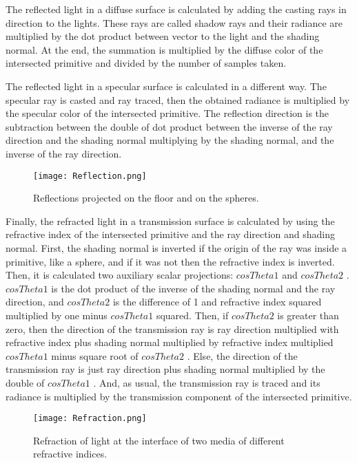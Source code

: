 \par
The reflected light in a diffuse surface is calculated by adding the casting rays in direction to the lights.
These rays are called shadow rays and their radiance are multiplied by the dot product between vector to the light and the shading normal.
At the end, the summation is multiplied by the diffuse color of the intersected primitive and divided by the number of samples taken.

\par
The reflected light in a specular surface is calculated in a different way.
The specular ray is casted and ray traced, then the obtained radiance is multiplied by the specular color of the intersected primitive.
The reflection direction is the subtraction between the double of dot product between the inverse of the ray direction and the shading normal multiplying by the shading normal, and the inverse of the ray direction.

\begin{figure}[H]
	\centering
	\caption{Reflections projected on the floor and on the spheres.}
	\label{Reflection.}
	\texttt{[image: Reflection.png]}
\end{figure}

\par
Finally, the refracted light in a transmission surface is calculated by using the refractive index of the intersected primitive and the ray direction and shading normal.
First, the shading normal is inverted if the origin of the ray was inside a primitive, like a sphere, and if it was not then the refractive index is inverted.
Then, it is calculated two auxiliary scalar projections:
$cosTheta1$
and
$cosTheta2$
.
$cosTheta1$
is the dot product of the inverse of the shading normal and the ray direction, and
$cosTheta2$
is the difference of 1 and refractive index squared multiplied by one minus
$cosTheta1$
squared.
Then, if
$cosTheta2$
is greater than zero, then the direction of the transmission ray is ray direction multiplied with refractive index plus shading normal multiplied by refractive index multiplied $cosTheta1$
minus square root of 
$cosTheta2$
.
Else, the direction of the transmission ray is just ray direction plus shading normal multiplied by the double of
$cosTheta1$
.
And, as usual, the transmission ray is traced and its radiance is multiplied by the transmission component of the intersected primitive.

\begin{figure}[H]
	\centering
	\caption{Refraction of light at the interface of two media of different refractive indices.}
	\label{Refraction.}
	\texttt{[image: Refraction.png]}
\end{figure}

